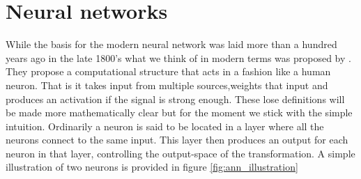 \section{Neural networks}

While the basis for the modern neural network was laid more than a hundred years ago in the late 1800's what we think of in modern terms was proposed by \citet{McCulloch1943}. They propose a computational structure that acts in a fashion like a human neuron. That is it takes input from multiple sources,weights that input and produces an activation if the signal is strong enough. These lose definitions will be made more mathematically clear but for the moment we stick with the simple intuition. Ordinarily a neuron is said to be located in a layer where all the neurons connect to the same input. This layer then produces an output for each neuron in that layer, controlling the output-space of the transformation. A simple illustration of two neurons is provided in figure \ref{fig:ann_illustration}




